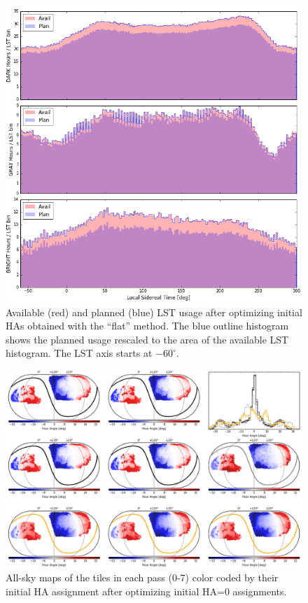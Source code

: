\documentclass[12pt]{article}
\begin{document}
\begin{figure}[htb]
\begin{center}
\includegraphics[width=6in]{LST_flat}
\caption{Available (red) and planned (blue) LST usage after optimizing initial HAs obtained with the ``flat'' method.  The blue outline histogram shows the planned usage rescaled to the area of the available LST histogram.  The LST axis starts at $-60^\circ$.}
\label{fig:LST_flat}
\end{center}
\end{figure}

\begin{figure}[htb]
\begin{center}
\includegraphics[width=6in]{HA_zero}
\caption{All-sky maps of the tiles in each pass (0-7) color coded by their initial HA assignment after optimizing initial HA=0 assignments.}
\label{fig:HA_zero}
\end{center}
\end{figure}
\end{document}
